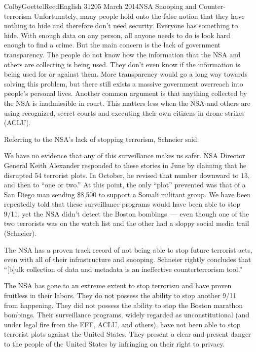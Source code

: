 \documentclass[12pt]{article}
\begin{document}
\begin{mla}{Colby}{Goettel}{Reed}{English 312}{05 March 2014}{NSA Snooping and Counter-terrorism}
Unfortunately, many people hold onto the false notion that they have nothing to hide and therefore don't need security. Everyone has something to hide. With enough data on any person, all anyone needs to do is look hard enough to find a crime. But the main concern is the lack of government transparency. The people do not know how the information that the NSA and others are collecting is being used. They don't even know if the information is being used for or against them. More transparency would go a long way towards solving this problem, but there still exists a massive government overreach into people's personal lives. Another common argument is that anything collected by the NSA is inadmissible in court. This matters less when the NSA and others are using recognized, secret courts and executing their own citizens in drone strikes (ACLU).

Referring to the NSA's lack of stopping terrorism, Schneier said:
\begin{mlaquote}
We have no evidence that any of this surveillance makes us safer. NSA Director General Keith Alexander responded to these stories in June by claiming that he disrupted 54 terrorist plots. In October, he revised that number downward to 13, and then to ``one or two.'' At this point, the only ``plot'' prevented was that of a San Diego man sending \$8,500 to support a Somali militant group. We have been repeatedly told that these surveillance programs would have been able to stop 9/11, yet the NSA didn't detect the Boston bombings~--- even though one of the two terrorists was on the watch list and the other had a sloppy social media trail (Schneier).
\end{mlaquote}
The NSA has a proven track record of not being able to stop future terrorist acts, even with all of their infrastructure and snooping. Schneier rightly concludes that ``[b]ulk collection of data and metadata is an ineffective counterterrorism tool.''

The NSA has gone to an extreme extent to stop terrorism and have proven fruitless in their labors. They do not possess the ability to stop another 9/11 from happening. They did not possess the ability to stop the Boston marathon bombings. Their surveillance programs, widely regarded as unconstitutional (and under legal fire from the EFF, ACLU, and others), have not been able to stop terrorist plots against the United States. They present a clear and present danger to the people of the United States by infringing on their right to privacy.


\end{mla}
\end{document}
